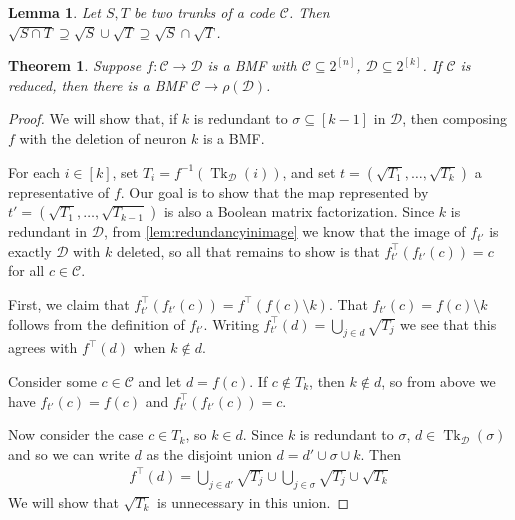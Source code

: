 \documentclass[10pt,a4paper]{amsart}
\newtheorem{lem}{Lemma}
\newtheorem{thm}{Theorem}
\def\cC{\mathcal{C}}
\def\cD{\mathcal{D}}
\DeclareMathOperator{\tk}{Tk}
\begin{document}
    \begin{lem}\label{lem:rootsofintersections}
        Let $S,T$ be two trunks of a code $\cC$. Then $\sqrt{S \cap T} \supseteq \sqrt{S} \cup \sqrt{T} \supseteq \sqrt{S} \cap \sqrt{T}$.
    \end{lem}

        \begin{thm}\label{lem:bmfredundancy}
            Suppose $f: \cC \to \cD$ is a BMF with $\cC \subseteq 2^{[n]}$, $\cD \subseteq 2^{[k]}$.
            If $\cC$ is reduced, 
            then there is a BMF $\cC \to \rho(\cD)$. %
        \end{thm}

        \begin{proof}
            We will show that, if $k$ is redundant to $\sigma \subseteq[k-1]$ in $\cD$, then composing $f$ with the deletion of neuron $k$ is a BMF.

            For each $i \in [k]$, set $T_i = f^{-1}(\tk_\cD(i))$, and set $t = (\sqrt{T_1},\dots,\sqrt{T_k})$ a representative of $f$. Our goal is to show that the map represented by $t' = (\sqrt{T_1},\dots,\sqrt{T_{k-1}})$ is also a Boolean matrix factorization. Since $k$ is redundant in $\cD$, from \cref{lem:redundancyinimage} we know that the image of  $f_{t'}$ is exactly $\cD$ with $k$ deleted, so all that remains to show is that $f_{t'}^\top (f_{t'}(c)) = c$ for all $c \in \cC$.
            
            First, we claim that $f_{t'}^\top(f_{t'}(c)) = f^\top(f(c)\setminus k)$.
            That $f_{t'}(c) = f(c) \setminus k$ follows from the definition of $f_{t'}$.
            Writing $f_{t'}^\top(d) = \bigcup_{j\in d} \sqrt{T_j}$ we see that this agrees with $f^\top(d)$ when $k \notin d$.
            
            Consider some $c \in \cC$ and let $d = f(c)$.
            If $c \notin T_k$, then $k \notin d$, so from above we have $f_{t'}(c) = f(c)$ and $f_{t'}^\top (f_{t'}(c)) = c$.

            Now consider the case $c \in T_k$, so $k \in d$.
            Since $k$ is redundant to $\sigma$, $d \in \tk_\cD(\sigma)$ and so we can write $d$ as the disjoint union $d = d' \cup \sigma \cup k$. Then
            \begin{align*}
                f^\top(d) = \bigcup_{j\in d'} \sqrt{T_j} \cup \bigcup_{j\in\sigma} \sqrt{T_j} \cup \sqrt{T_k}\tag{*}\label{eq:needtoreducefactor}
            \end{align*}
            We will show that $\sqrt{T_k}$ is unnecessary in this union.
            

\end{proof}
\end{document}
